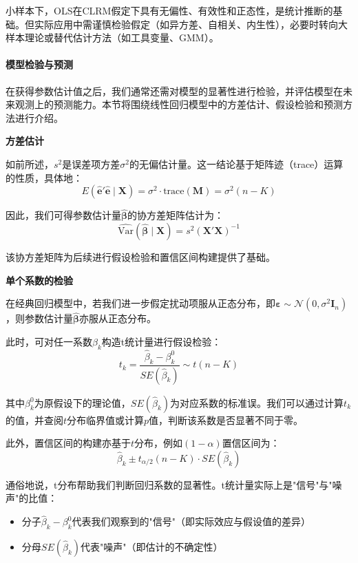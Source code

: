 小样本下，OLS在CLRM假定下具有无偏性、有效性和正态性，是统计推断的基础。但实际应用中需谨慎检验假定（如异方差、自相关、内生性），必要时转向大样本理论或替代估计方法（如工具变量、GMM）。

\paragraph*{模型检验与预测}

在获得参数估计值之后，我们通常还需对模型的显著性进行检验，并评估模型在未来观测上的预测能力。本节将围绕线性回归模型中的方差估计、假设检验和预测方法进行介绍。

\textbf{方差估计}

如前所述，$s^2$是误差项方差$\sigma^2$的无偏估计量。这一结论基于矩阵迹（trace）运算的性质，具体地：
\begin{equation}
	E(\hat{\mathbf{e}}'\hat{\mathbf{e}} \mid \mathbf{X}) = \sigma^2 \cdot \text{trace}(\mathbf{M}) = \sigma^2 (n - K)
\end{equation}

因此，我们可得参数估计量$\hat{\boldsymbol{\beta}}$的协方差矩阵估计为：
\begin{equation}
	\widehat{\text{Var}}(\hat{\boldsymbol{\beta}} \mid \mathbf{X}) = s^2 (\mathbf{X}'\mathbf{X})^{-1}
\end{equation}

该协方差矩阵为后续进行假设检验和置信区间构建提供了基础。

\textbf{单个系数的检验}

在经典回归模型中，若我们进一步假定扰动项服从正态分布，即$\boldsymbol{\varepsilon} \sim \mathcal{N}(0, \sigma^2 \mathbf{I}_n)$，则参数估计量$\hat{\boldsymbol{\beta}}$亦服从正态分布。

此时，可对任一系数$\beta_k$构造t统计量进行假设检验：
\begin{equation}
	t_k = \frac{\hat{\beta}_k - \beta_k^0}{SE(\hat{\beta}_k)} \sim t(n-K)
\end{equation}

其中$\beta_k^0$为原假设下的理论值，$SE(\hat{\beta}_k)$为对应系数的标准误。我们可以通过计算$t_k$的值，并查阅$t$分布临界值或计算$p$值，判断该系数是否显著不同于零。

此外，置信区间的构建亦基于$t$分布，例如$(1-\alpha)$置信区间为：
\begin{equation}
\hat{\beta}_k \pm t_{\alpha/2}(n-K) \cdot SE(\hat{\beta}_k)
\end{equation}

通俗地说，t分布帮助我们判断回归系数的显著性。t统计量实际上是"信号"与"噪声"的比值：
\begin{itemize}
\item 分子$\hat{\beta}_k - \beta_k^0$代表我们观察到的"信号"（即实际效应与假设值的差异）
\item 分母$SE(\hat{\beta}_k)$代表"噪声"（即估计的不确定性）
\end{itemize}


